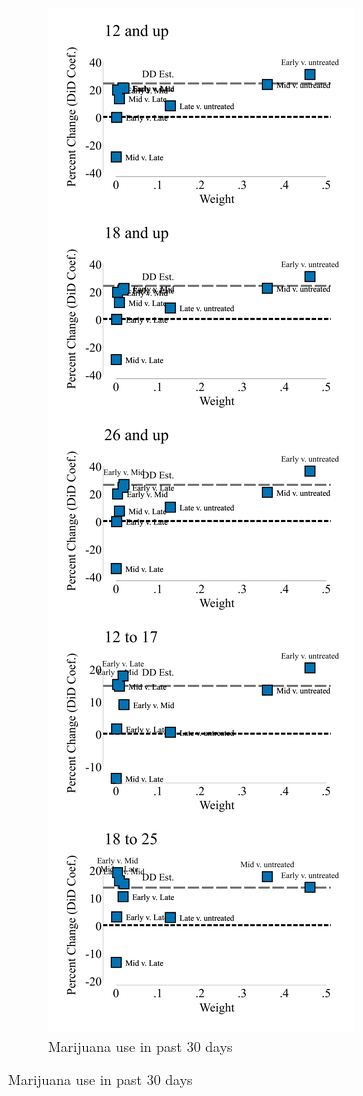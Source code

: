 \documentclass[12pt]{article}%
\begin{document}
\begin{appendices}
\begin{figure}
\begin{minipage}{.9\linewidth}
\begin{subfigure}[b]{0.32\columnwidth}
  \end{subfigure}
  \hfill %
  \begin{subfigure}[b]{0.32\columnwidth}
      \caption{\scriptsize{Marijuana use in past 30 days}}
    \includegraphics[width=\linewidth]{../output/plots/bacon_weights_ln_mj_use_30.pdf}

\end{subfigure}
\end{minipage}
\end{figure}
\end{appendices}
\end{document}
